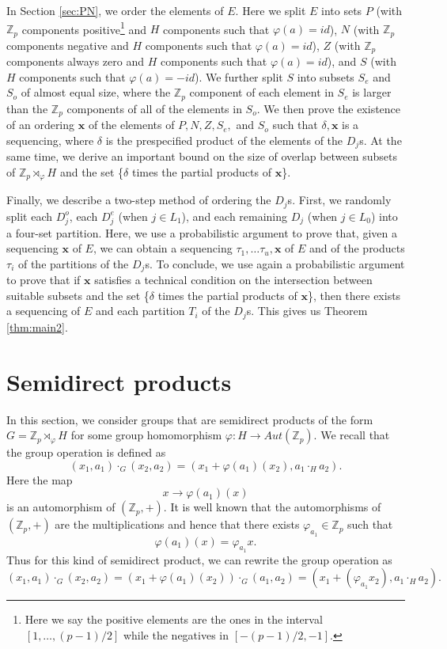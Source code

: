 \documentclass[11pt]{amsart}
\theoremstyle{definition}
\begin{document}
In Section \ref{sec:PN}, we order the elements of $E$. Here we split $E$ into sets $P$ (with $\mathbb{Z}_p$ components positive\footnote{Here we say the positive elements are the ones in the interval $[1,\dots,(p-1)/2]$ while the negatives in $[-(p-1)/2, -1]$.} and $H$ components such that $\varphi(a) = id$), $N$ (with $\mathbb{Z}_p$ components negative and $H$ components such that $\varphi(a) = id$), $Z$ (with $\mathbb{Z}_p$ components always zero and $H$ components such that $\varphi(a) = id$), and $S$ (with $H$ components such that $\varphi(a) = -id$). We further split $S$ into subsets $S_e$ and $S_o$ of almost equal size, where the $\mathbb{Z}_p$ component of each element in $S_e$ is larger than the $\mathbb{Z}_p$ components of all of the elements in $S_o$. We then prove the existence of an ordering $\mathbf{x}$ of the elements of $P, N, Z,S_e,$ and $S_o$ such that $\delta, \mathbf{x}$ is a sequencing, where $\delta$ is the prespecified product of the elements of the $D_j$s. At the same time, we derive an important bound on the size of overlap between subsets of $\mathbb{Z}_{p} \rtimes_{\varphi} H$ and the set \{$\delta$ times the partial products of $\mathbf{x}$\}. 

Finally, we describe a two-step method of ordering the $D_j$s. First, we randomly split each $D^o_j$, each $D^e_j$ (when $j\in L_1$), and each remaining $D_j$ (when $j\in L_0$) into a four-set partition. 
Here, we use a probabilistic argument to prove that, given a sequencing $\mathbf{x}$ of $E$, we can obtain a sequencing $\tau_1,\dots \tau_u, \mathbf{x}$ of $E$ and of the products $\tau_i$ of the partitions of the $D_j$s.
To conclude, we use again a probabilistic argument to prove that if $\mathbf{x}$ satisfies a technical condition on the intersection between suitable subsets and the set \{$\delta$ times the partial products of $\mathbf{x}$\}, then there exists a sequencing of $E$ and each partition $T_i$ of the $D_j$s.
This gives us Theorem \ref{thm:main2}.
\section{Semidirect products}\label{sec: semidirect}
In this section, we consider groups that are semidirect products of the form $G=\mathbb{Z}_{p} \rtimes_{\varphi} H$ for some group homomorphism $\varphi: H \rightarrow Aut(\mathbb{Z}_p)$. We recall that the group operation is defined as
$$(x_1, a_1)\cdot_G (x_2, a_2)=(x_1+ \varphi(a_1)(x_2), a_1\cdot_H a_2).$$
Here the map
$$x\rightarrow \varphi(a_1)(x)$$
is an automorphism of $(\mathbb{Z}_p,+)$. It is well known that the automorphisms of $(\mathbb{Z}_p,+)$ are the multiplications and hence that there exists $\varphi_{a_1}\in \mathbb{Z}_p$ such that
$$\varphi(a_1)(x)=\varphi_{a_1}x.$$
Thus for this kind of semidirect product, we can rewrite the group operation as
$$(x_1, a_1)\cdot_G (x_2, a_2)=(x_1+ \varphi(a_1)(x_2))\cdot_G (a_1, a_2)=(x_1 + (\varphi_{a_1} x_2), a_1\cdot_H a_2).$$
\end{document}
